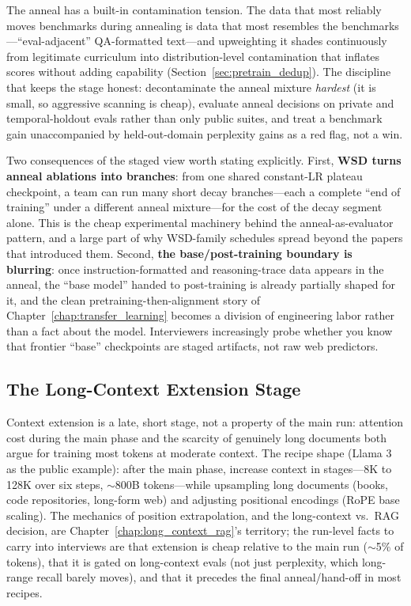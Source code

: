 \begin{warningbox}
The anneal has a built-in contamination tension. The data that most reliably moves benchmarks during annealing is data that most resembles the benchmarks---``eval-adjacent'' QA-formatted text---and upweighting it shades continuously from legitimate curriculum into distribution-level contamination that inflates scores without adding capability (Section~\ref{sec:pretrain_dedup}). The discipline that keeps the stage honest: decontaminate the anneal mixture \textit{hardest} (it is small, so aggressive scanning is cheap), evaluate anneal decisions on private and temporal-holdout evals rather than only public suites, and treat a benchmark gain unaccompanied by held-out-domain perplexity gains as a red flag, not a win.
\end{warningbox}

Two consequences of the staged view worth stating explicitly. First, \textbf{WSD turns anneal ablations into branches}: from one shared constant-LR plateau checkpoint, a team can run many short decay branches---each a complete ``end of training'' under a different anneal mixture---for the cost of the decay segment alone. This is the cheap experimental machinery behind the anneal-as-evaluator pattern, and a large part of why WSD-family schedules spread beyond the papers that introduced them. Second, \textbf{the base/post-training boundary is blurring}: once instruction-formatted and reasoning-trace data appears in the anneal, the ``base model'' handed to post-training is already partially shaped for it, and the clean pretraining-then-alignment story of Chapter~\ref{chap:transfer_learning} becomes a division of engineering labor rather than a fact about the model. Interviewers increasingly probe whether you know that frontier ``base'' checkpoints are staged artifacts, not raw web predictors.

\subsection{The Long-Context Extension Stage}

Context extension is a late, short stage, not a property of the main run: attention cost during the main phase and the scarcity of genuinely long documents both argue for training most tokens at moderate context. The recipe shape (Llama 3 as the public example): after the main phase, increase context in stages---8K to 128K over six steps, $\sim$800B tokens---while upsampling long documents (books, code repositories, long-form web) and adjusting positional encodings (RoPE base scaling). The mechanics of position extrapolation, and the long-context vs.\ RAG decision, are Chapter~\ref{chap:long_context_rag}'s territory; the run-level facts to carry into interviews are that extension is cheap relative to the main run ($\sim$5\% of tokens), that it is gated on long-context evals (not just perplexity, which long-range recall barely moves), and that it precedes the final anneal/hand-off in most recipes.

